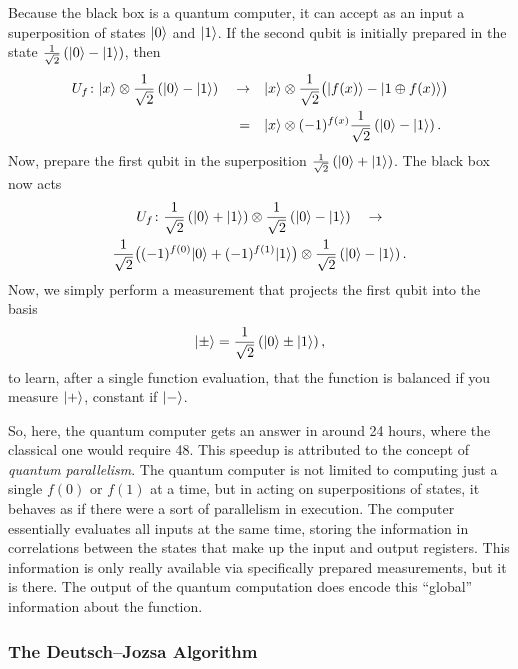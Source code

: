 Because the black box is a quantum computer, it can accept
as an input a superposition of states ${|{0}\rangle}$ and ${|{1}\rangle}$.
If the second qubit is initially prepared in the state
$\frac{1}{\sqrt{2}}\left( {|{0}\rangle} - {|{1}\rangle} \right)$, then
\begin{equation}
\begin{split}
U_f\colon {|{x}\rangle}\otimes\frac{1}{\sqrt{2}}\left( {|{0}\rangle} - {|{1}\rangle} \right)
\quad\to&\quad{|{x}\rangle}\otimes\frac{1}{\sqrt{2}}\bigl({|{f(x)}\rangle} - {|{1\oplus f(x)}\rangle}\bigr)\\
=&\quad{|{x}\rangle}\otimes(-1)^{f(x)}\frac{1}{\sqrt{2}}\left( {|{0}\rangle} - {|{1}\rangle} \right).
\end{split}
\end{equation}
Now, prepare the first qubit in the superposition 
$\frac{1}{\sqrt{2}}\left( {|{0}\rangle} + {|{1}\rangle} \right)$.
The black box now acts
\begin{multline}
U_f\colon \frac{1}{\sqrt{2}}\left( {|{0}\rangle} + {|{1}\rangle} \right)
        \otimes\frac{1}{\sqrt{2}}\left( {|{0}\rangle} - {|{1}\rangle} \right) \quad\to\\
        \frac{1}{\sqrt{2}}\bigl( (-1)^{f(0)}{|{0}\rangle} + (-1)^{f(1)}{|{1}\rangle} \bigr)
        \otimes\frac{1}{\sqrt{2}}\left( {|{0}\rangle} - {|{1}\rangle} \right).
\end{multline}
Now, we simply perform a measurement that projects the first qubit into
the basis
\begin{equation}
{|{\pm}\rangle} = \frac{1}{\sqrt{2}}\left( {|{0}\rangle} \pm {|{1}\rangle} \right),
\end{equation}
to learn, after a single function evaluation, that the function is
balanced if you measure ${|{+}\rangle}$, constant if ${|{-}\rangle}$.

So, here, the quantum computer gets an answer in around 24 hours, where
the classical one would require 48.  This speedup is attributed to
the concept of \emph{quantum parallelism}.  The quantum computer is not
limited to computing just a single $f(0)$ or $f(1)$ at a time, but in acting on
superpositions of states, it behaves as if there were a sort of 
parallelism in execution.  The computer essentially evaluates all inputs
at the same time, storing the information in correlations between the states
that make up the input and output registers.  This information
is only really available via specifically prepared measurements, but it is
there.  The output of the quantum computation does encode this ``global''
information about the function.

\subsubsection{The Deutsch--Jozsa Algorithm}
\label{ss:deutschJosza}


